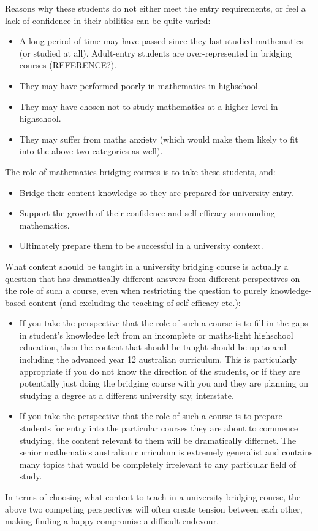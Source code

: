 \documentclass[twoside,12pt,a4paper]{report}
\begin{document}
Reasons why these students do not either meet the entry requirements, or feel a lack of confidence in their abilities can be quite varied:
\begin{itemize}
	\item A long period of time may have passed since they last studied mathematics (or studied at all). Adult-entry students are over-represented in bridging courses (REFERENCE?).
	\item They may have performed poorly in mathematics in highschool.
	\item They may have chosen not to study mathematics at a higher level in highschool.
	\item They may suffer from maths anxiety (which would make them likely to fit into the above two categories as well).
\end{itemize}
	
The role of mathematics bridging courses is to take these students, and:
\begin{itemize}
	\item Bridge their content knowledge so they are prepared for university entry.
	\item Support the growth of their confidence and self-efficacy surrounding mathematics.
	\item Ultimately prepare them to be successful in a university context.
\end{itemize}

What content should be taught in a university bridging course is actually a question that has dramatically different answers from different perspectives on the role of such a course, even when restricting the question to purely knowledge-based content (and excluding the teaching of self-efficacy etc.):
\begin{itemize}
	\item If you take the perspective that the role of such a course is to fill in the gaps in student's knowledge left from an incomplete or maths-light highschool education, then the content that should be taught should be up to and including the advanced year 12 australian curriculum. This is particularly appropriate if you do not know the direction of the students, or if they are potentially just doing the bridging course with you and they are planning on studying a degree at a different university say, interstate.
	\item If you take the perspective that the role of such a course is to prepare students for entry into the particular courses they are about to commence studying, the content relevant to them will be dramatically differnet. The senior mathematics australian curriculum is extremely generalist and contains many topics that would be completely irrelevant to any particular field of study. 
\end{itemize}
In terms of choosing what content to teach in a university bridging course, the above two competing perspectives will often create tension between each other, making finding a happy compromise a difficult endevour. 
\end{document}
